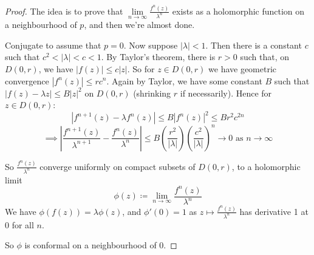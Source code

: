 \documentclass[10pt,a4paper]{article}
\begin{document}
\begin{proof}
  The idea is to prove that $\lim\limits_{n\to\infty} \frac{f^n(z)}{\lambda^n}$ exists as a holomorphic function on a neighbourhood of $p$, and then we're almost done.

  Conjugate to assume that $p=0$. Now suppose $|\lambda|<1$. Then there is a constant $c$ such that $c^2<|\lambda|<c<1$. By Taylor's theorem, there is $r >0$ such that, on $D(0, r)$, we have $|f(z)|\leq c|z|$. So for $z \in D(0,r)$ we have geometric convergence $|f^n(z)| \leq rc^n$. Again by Taylor, we have some constant $B$ such that $|f(z)-\lambda z| \leq B|z|^2$ on $D(0,r)$ (shrinking $r$ if necessarily). Hence for $z \in D(0,r)$:
  \[|f^{n+1}(z)-\lambda f^n(z)| \leq B|f^n(z)|^2 \leq B r^2c^{2n}\]
  \[\implies \left|\frac{f^{n+1}(z)}{\lambda^{n+1}} - \frac{f^n(z)}{\lambda^n}\right| \leq B\left(\frac{r^2}{|\lambda|}\right)\left(\frac{c^2}{|\lambda|}\right)^n \to 0 \text{ as } n \to \infty\]

  So $\frac{f^n(z)}{\lambda^n}$ converge uniformly on compact subsets of $D(0,r)$, to a holomorphic limit
  \[\phi(z) \coloneqq \lim_{n\to\infty} \frac{f^n(z)}{\lambda^n}\]
  We have $\phi(f(z)) = \lambda \phi(z)$, and $\phi'(0) = 1$ as $z \mapsto \frac{f^n(z)}{\lambda^n}$ has derivative 1 at $0$ for all $n$.

  So $\phi$ is conformal on a neighbourhood of $0$.


\end{proof}
\end{document}
